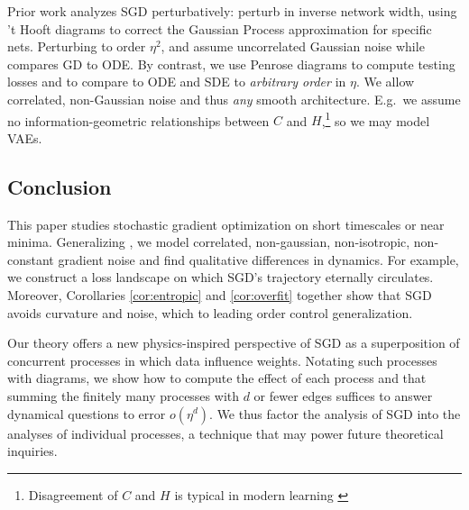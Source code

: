         
            Prior work analyzes SGD perturbatively: \cite{dy19} perturb in
            inverse network width, using 't Hooft diagrams to correct the
            Gaussian Process approximation for specific nets.  Perturbing
            to order $\eta^2$, \cite{ch18} and \cite{li17} assume uncorrelated
            Gaussian noise while \cite{ba21} compares GD to ODE.
            By contrast, we use Penrose diagrams \cite{pe71} to compute
            testing losses and to compare to ODE and SDE to \emph{arbitrary
            order} in $\eta$.  
            We allow correlated,
            non-Gaussian noise and thus \emph{any} smooth architecture.
            E.g.\
            we assume no information-geometric relationships between $C$ and
            $H$,\footnote{
                Disagreement of $C$ and
                $H$ is typical in modern learning \citep{ro12, ku19}
            } so we may model VAEs.  


\subsection{Conclusion}


            This paper
            studies stochastic gradient optimization on short timescales
            or near minima. 
Generalizing \cite{li18,we19b,zh19,ba21}, we model correlated, non-gaussian,
non-isotropic, non-constant gradient noise and find qualitative differences in
dynamics.  For example, we construct a loss landscape on which
SGD's trajectory eternally circulates.
            Moreover,
            Corollaries \ref{cor:entropic} and
            \ref{cor:overfit} together show that SGD avoids curvature and
            noise, which to leading order control generalization.


    Our theory offers a new physics-inspired perspective of SGD as a
    superposition of concurrent processes in which data influence weights.
    Notating such processes with diagrams, we show how to compute the
    effect of each process and that summing the finitely many processes with
    $d$ or fewer edges suffices to answer dynamical questions to error
    $o(\eta^d)$.  We thus factor the analysis of SGD into the analyses of
    individual processes, a technique that may power future theoretical
    inquiries.  



